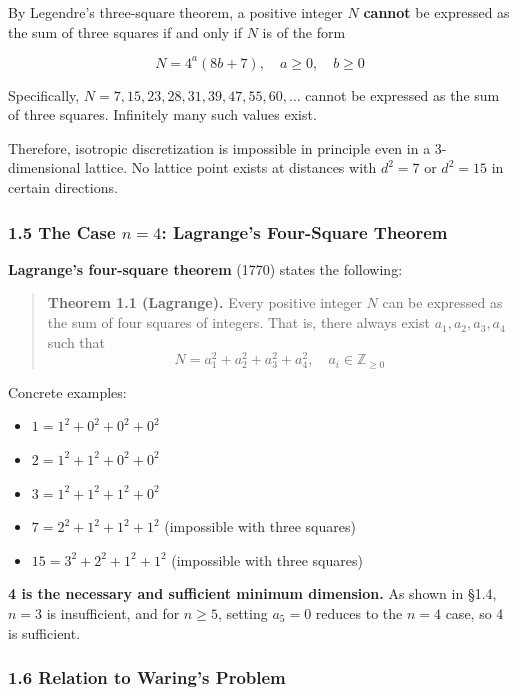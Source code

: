 \documentclass[a4paper,11pt]{article}
\providecommand{\tightlist}{\setlength{\itemsep}{0pt}\setlength{\parskip}{0pt}}
\begin{document}
By Legendre's three-square theorem, a positive integer \(N\)
\textbf{cannot} be expressed as the sum of three squares if and only if
\(N\) is of the form

\[N = 4^a(8b + 7), \quad a \geq 0, \quad b \geq 0\]

Specifically, \(N = 7, 15, 23, 28, 31, 39, 47, 55, 60, \ldots\) cannot
be expressed as the sum of three squares. Infinitely many such values
exist.

Therefore, isotropic discretization is impossible in principle even in a
3-dimensional lattice. No lattice point exists at distances with
\(d^2 = 7\) or \(d^2 = 15\) in certain directions.

\subsubsection{\texorpdfstring{1.5 The Case \(n = 4\): Lagrange's
Four-Square
Theorem}{1.5 The Case n = 4: Lagrange's Four-Square Theorem}}\label{the-case-n-4-lagranges-four-square-theorem}

\textbf{Lagrange's four-square theorem} (1770) states the following:

\begin{quote}
\textbf{Theorem 1.1 (Lagrange).} Every positive integer \(N\) can be
expressed as the sum of four squares of integers. That is, there always
exist \(a_1, a_2, a_3, a_4\) such that
\[N = a_1^2 + a_2^2 + a_3^2 + a_4^2, \quad a_i \in \mathbb{Z}_{\geq 0}\]
\end{quote}

Concrete examples:

\begin{itemize}
\tightlist
\item
  \(1 = 1^2 + 0^2 + 0^2 + 0^2\)
\item
  \(2 = 1^2 + 1^2 + 0^2 + 0^2\)
\item
  \(3 = 1^2 + 1^2 + 1^2 + 0^2\)
\item
  \(7 = 2^2 + 1^2 + 1^2 + 1^2\) (impossible with three squares)
\item
  \(15 = 3^2 + 2^2 + 1^2 + 1^2\) (impossible with three squares)
\end{itemize}

\textbf{4 is the necessary and sufficient minimum dimension.} As shown
in §1.4, \(n = 3\) is insufficient, and for \(n \geq 5\), setting
\(a_5 = 0\) reduces to the \(n = 4\) case, so 4 is sufficient.

\subsubsection{1.6 Relation to Waring's
Problem}\label{relation-to-warings-problem}
\end{document}
